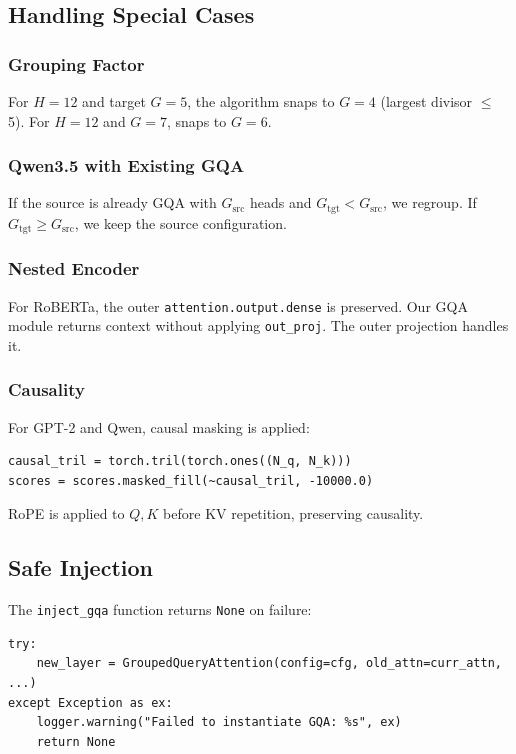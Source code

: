 \subsection{Handling Special Cases}

\subsubsection{Grouping Factor}

For $H = 12$ and target $G = 5$, the algorithm snaps to $G = 4$ (largest 
divisor $\le$ 5). For $H = 12$ and $G = 7$, snaps to $G = 6$.

\subsubsection{Qwen3.5 with Existing GQA}

If the source is already GQA with $G_\text{src}$ heads and $G_\text{tgt} < G_\text{src}$, 
we regroup. If $G_\text{tgt} \ge G_\text{src}$, we keep the source configuration.

\subsubsection{Nested Encoder}

For RoBERTa, the outer \texttt{attention.output.dense} is preserved. Our GQA module 
returns context without applying \texttt{out\_proj}. The outer projection handles it.

\subsubsection{Causality}

For GPT-2 and Qwen, causal masking is applied:

\begin{lstlisting}
causal_tril = torch.tril(torch.ones((N_q, N_k)))
scores = scores.masked_fill(~causal_tril, -10000.0)
\end{lstlisting}

RoPE is applied to $Q, K$ before KV repetition, preserving causality.

\subsection{Safe Injection}

The \texttt{inject\_gqa} function returns \texttt{None} on failure:

\begin{lstlisting}
try:
    new_layer = GroupedQueryAttention(config=cfg, old_attn=curr_attn, ...)
except Exception as ex:
    logger.warning("Failed to instantiate GQA: %s", ex)
    return None
\end{lstlisting}

